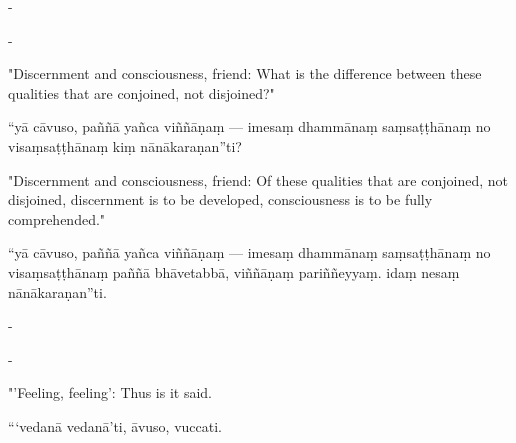 \begin{samepage}
\begin{leftcolumn*}
-
\end{leftcolumn*}

\begin{rightcolumn}
-
\end{rightcolumn}
\end{samepage}

\begin{samepage}
\begin{leftcolumn*}
"Discernment and consciousness, friend: What is the difference between these qualities that are conjoined, not disjoined?"
\end{leftcolumn*}

\begin{rightcolumn}
“yā cāvuso, paññā yañca viññāṇaṃ — imesaṃ dhammānaṃ saṃsaṭṭhānaṃ no visaṃsaṭṭhānaṃ kiṃ nānākaraṇan”ti?
\end{rightcolumn}
\end{samepage}

\begin{samepage}
\begin{leftcolumn*}
"Discernment and consciousness, friend: Of these qualities that are conjoined, not disjoined, discernment is to be developed, consciousness is to be fully comprehended."
\end{leftcolumn*}

\begin{rightcolumn}
“yā cāvuso, paññā yañca viññāṇaṃ — imesaṃ dhammānaṃ saṃsaṭṭhānaṃ no visaṃsaṭṭhānaṃ paññā bhāvetabbā, viññāṇaṃ pariññeyyaṃ. idaṃ nesaṃ nānākaraṇan”ti.
\end{rightcolumn}
\end{samepage}

\begin{samepage}
\begin{leftcolumn*}
-
\end{leftcolumn*}

\begin{rightcolumn}
-
\end{rightcolumn}
\end{samepage}

\begin{samepage}
\begin{leftcolumn*}
"'Feeling, feeling': Thus is it said.
\end{leftcolumn*}

\begin{rightcolumn}
“‘vedanā vedanā’ti, āvuso, vuccati.
\end{rightcolumn}
\end{samepage}

